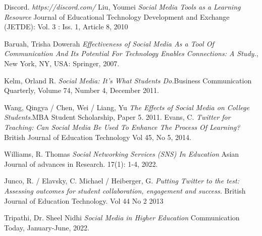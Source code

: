 \documentclass[lettersize,journal]{IEEEtran}
\begin{document}
\begin{thebibliography}{}

        Discord. {\it{https://discord.com/}}
        Liu, Youmei {\it{Social Media Tools as a Learning Resource}} Journal of Educational Technology Development and Exchange (JETDE): Vol. 3 : Iss. 1, Article 8, 2010

    Baruah, Trisha Dowerah {\it{Effectiveness of Social Media As a Tool Of Communication And Its Potential For Technology Enables Connections: A Study.}}, New York, NY, USA: Springer, 2007.

    Kelm, Orland R. {\it{Social Media: It's What Students Do.}}Business Communication Quarterly, Volume 74, Number 4, December 2011.

        Wang, Qingya / Chen, Wei / Liang, Yu {\it{The Effects of Social Media on College Students}}.MBA Student Scholarship, Paper 5. 2011.
        Evans, C. {\it{Twitter for Teaching: Can Social Media Be Used To Enhance The Process Of Learning?}} British Journal of Education Technology
Vol 45, No 5, 2014.

        Williams, R. Thomas {\it{Social Networking Services (SNS) In Education}}
        Asian Journal of advances in Research. 17(1): 1-4, 2022.

        Junco, R. / Elavsky, C. Michael / Heiberger, G. {\it{Putting Twitter to
        the test: Assessing outcomes for student collaboration, engagement and
        success.}} British Journal of Education Technology. Vol 44 No 2 2013

        Tripathi, Dr. Sheel Nidhi {\it{Social Media in Higher Education}}
        Communication Today, January-June, 2022.


\end{thebibliography}
\end{document}
